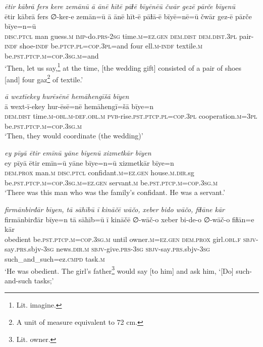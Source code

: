 \ea \label{RE.11}
\textit{ētir kābrā fers kere zemānū ā ānē hītē pāɫē bīyēnēū čwār gezē pārče bīyenū} \\ 
\gll ētir kābrā fers ∅-ker-e zemān=ū ā ānē hīt-ē pāɫā-ē bīyē=nē=ū čwār gez-ē pārče bīye=n=ū \\ 
 \textsc{disc.ptcl} man guess\textsc{.m} \textsc{imp-}do\textsc{.prs}-\textsc{2sg} time\textsc{.m}\textsc{=ez.gen} \textsc{dem.dist} \textsc{dem.dist}\textsc{.3pl} pair\textsc{-indf} shoe\textsc{-indf} be\textsc{.ptcp}\textsc{.pl}\textsc{=cop}\textsc{.3pl}=and four ell\textsc{.m}\textsc{-indf} textile\textsc{.m} be\textsc{.pst}\textsc{.ptcp}\textsc{.m}\textsc{=cop}\textsc{.3sg}\textsc{.m}=and \\ 
\glt `Then, let us say,\footnote{Lit. imagine.} at the time, [the wedding gift] consisted of a pair of shoes [and] four gaz\footnote{A unit of measure equivalent to 72 cm.} of textile.'
\z 
 
\ea \label{RE.14}
\textit{ā wextīekey hurēsēnē hemāhengīšā bīyen} \\ 
\gll ā wext-ī-ekey hur-ēsē=nē hemāhengī=šā bīye=n \\ 
 \textsc{dem.dist} time\textsc{.m}\textsc{-obl}\textsc{.m}\textsc{-def}\textsc{.obl}\textsc{.m} \textsc{pvb-}rise\textsc{.pst}\textsc{.ptcp}\textsc{.pl}\textsc{=cop}\textsc{.3pl} cooperation\textsc{.m}\textsc{=3pl} be\textsc{.pst}\textsc{.ptcp}\textsc{.m}\textsc{=cop}\textsc{.3sg}\textsc{.m} \\ 
\glt `Then, they would coordinate (the wedding)'
\z 
 
\ea \label{RE.16}
\textit{ey pīyā ētir emīnū yāne bīyenū xizmetkār bīyen} \\ 
\gll ey pīyā ētir emīn=ū yāne bīye=n=ū xizmetkār bīye=n \\ 
 \textsc{dem.prox} man\textsc{.m} \textsc{disc.ptcl} confidant\textsc{.m}\textsc{=ez.gen} house\textsc{.m}\textsc{.dir}.sg be\textsc{.pst}\textsc{.ptcp}\textsc{.m}\textsc{=cop}\textsc{.3sg}\textsc{.m}\textsc{=ez.gen} servant\textsc{.m} be\textsc{.pst}\textsc{.ptcp}\textsc{.m}\textsc{=cop}\textsc{.3sg}\textsc{.m} \\ 
\glt `There was this man who was the family’s confidant. He was a servant.'
\z 
 
\ea \label{RE.18}
\textit{firmānbirđār bīyen, tā sāhībū ī kināčē wāčo, xeber bido wāčo, fiɫāne kār} \\ 
\gll firmānbirđār bīye=n tā sāhīb=ū ī kināčē ∅-wāč-o xeber bi-de-o ∅-wāč-o fiɫān=e kār \\ 
 obedient be\textsc{.pst}\textsc{.ptcp}\textsc{.m}\textsc{=cop}\textsc{.3sg}\textsc{.m} until owner\textsc{.m}\textsc{=ez.gen} \textsc{dem.prox} girl\textsc{.obl}\textsc{.f} \textsc{sbjv-}say\textsc{.prs}.sbjv\textsc{-3sg} news\textsc{.dir}\textsc{.m} \textsc{sbjv-}give\textsc{.prs}\textsc{-3sg} \textsc{sbjv-}say\textsc{.prs}.sbjv\textsc{-3sg} such\_and\_such=ez\textsc{.cmpd} task\textsc{.m} \\ 
\glt `He was obedient. The girl’s father\footnote{Lit. owner.} would say [to him] and ask him, ‘[Do] such-and-such tasks;'
\z 
 
